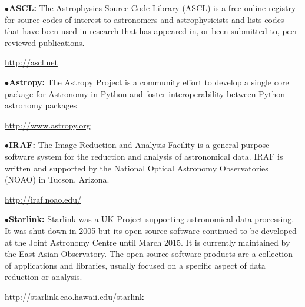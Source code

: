 



\medskip

%

\medskip

\item{$\bullet$}{\bf ASCL:} 
The Astrophysics Source Code Library (ASCL) is a free online registry for source codes of interest to astronomers and astrophysicists and lists codes that have been used in research that has appeared in, or been submitted to, peer-reviewed publications. 
	\item{}\qquad\url{http://ascl.net}

\medskip

\item{$\bullet$}{\bf Astropy:} 
The Astropy Project is a community effort to develop a single core package for Astronomy in Python and foster interoperability between Python astronomy packages
	\item{}\qquad\url{http://www.astropy.org}

\medskip

\item{$\bullet$}{\bf IRAF:} 
The Image Reduction and Analysis Facility is a general purpose software system for the reduction and analysis of astronomical data. IRAF is written and supported by the National Optical Astronomy Observatories (NOAO) in Tucson, Arizona.
	\item{}\qquad\url{http://iraf.noao.edu/}

\medskip

\item{$\bullet$}{\bf Starlink:}
Starlink was a UK Project supporting astronomical data processing. It was shut down in 2005 but its open-source software continued to be developed at the Joint Astronomy Centre until March 2015. It is currently maintained by the East Asian Observatory. The open-source software products are a collection of applications and libraries, usually focused on a specific aspect of data reduction or analysis.
	\item{}\qquad\url{http://starlink.eao.hawaii.edu/starlink}

